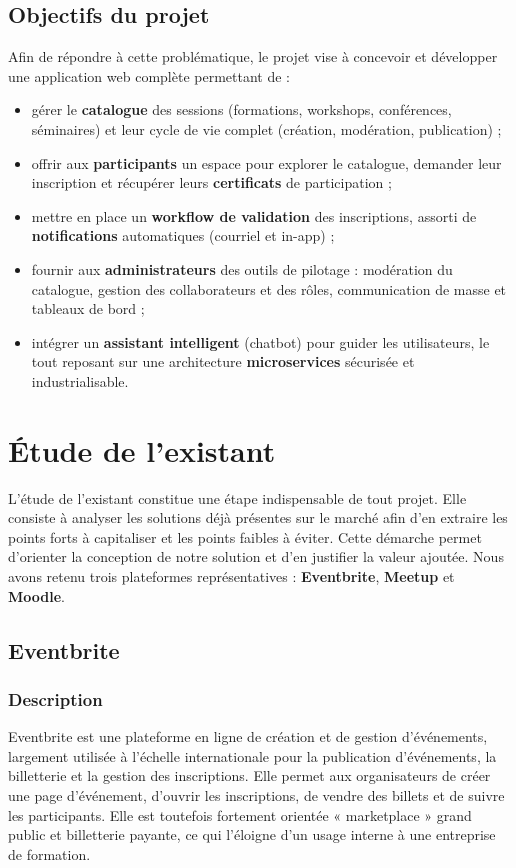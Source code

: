 \documentclass[12pt,a4paper,oneside]{report}
\begin{document}
\subsection{Objectifs du projet}
Afin de répondre à cette problématique, le projet vise à concevoir et développer une
application web complète permettant de :

\begin{itemize}[leftmargin=1.2cm]
  \item gérer le \textbf{catalogue} des sessions (formations, workshops, conférences,
  séminaires) et leur cycle de vie complet (création, modération, publication) ;
  \item offrir aux \textbf{participants} un espace pour explorer le catalogue, demander leur
  inscription et récupérer leurs \textbf{certificats} de participation ;
  \item mettre en place un \textbf{workflow de validation} des inscriptions, assorti de
  \textbf{notifications} automatiques (courriel et in-app) ;
  \item fournir aux \textbf{administrateurs} des outils de pilotage : modération du catalogue,
  gestion des collaborateurs et des rôles, communication de masse et tableaux de bord ;
  \item intégrer un \textbf{assistant intelligent} (chatbot) pour guider les utilisateurs, le
  tout reposant sur une architecture \textbf{microservices} sécurisée et industrialisable.
\end{itemize}

\section{Étude de l'existant}
L'étude de l'existant constitue une étape indispensable de tout projet. Elle consiste à
analyser les solutions déjà présentes sur le marché afin d'en extraire les points forts à
capitaliser et les points faibles à éviter. Cette démarche permet d'orienter la conception de
notre solution et d'en justifier la valeur ajoutée. Nous avons retenu trois plateformes
représentatives : \textbf{Eventbrite}, \textbf{Meetup} et \textbf{Moodle}.

\subsection{Eventbrite}
\subsubsection{Description}
Eventbrite est une plateforme en ligne de création et de gestion d'événements, largement
utilisée à l'échelle internationale pour la publication d'événements, la billetterie et la
gestion des inscriptions. Elle permet aux organisateurs de créer une page d'événement,
d'ouvrir les inscriptions, de vendre des billets et de suivre les participants. Elle est
toutefois fortement orientée « marketplace » grand public et billetterie payante, ce qui
l'éloigne d'un usage interne à une entreprise de formation.
\end{document}
